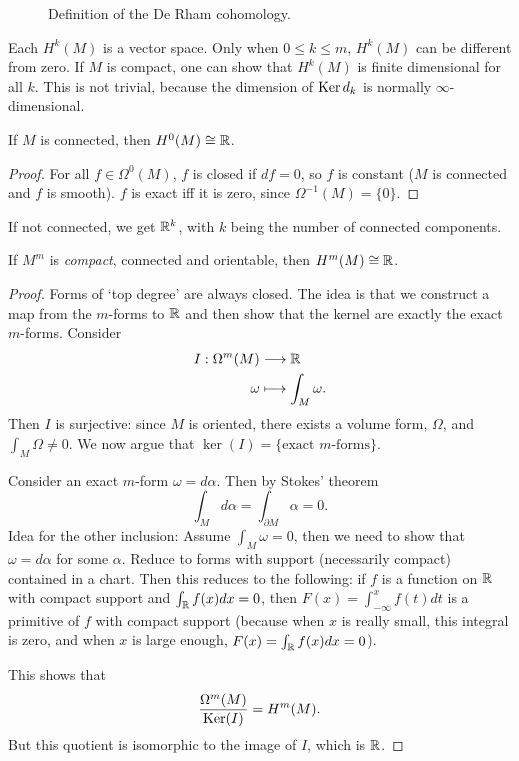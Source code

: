 \begin{figure}[H]
    \centering
    \caption{Definition of the De Rham cohomology. }
    \label{fig:rham-cohomology-definition}
\end{figure}
\begin{remark}
    Each $H^{k}(M)$ is a vector space.
    Only when $0 \le k \le m$, $H^{k}(M)$ can be different from zero.
    If $M$ is compact, one can show that $H^{k}(M)$ is finite dimensional for all $k$.
    This is not trivial, because the dimension of $\operatorname{Ker} d_k$ is normally $\infty$-dimensional.
 \end{remark}

\begin{prop}
    If $M$ is connected, then $H^{0}(M) \cong \mathbb{R}$.
\end{prop}
\begin{proof}
    For all $f \in \Omega^{0}(M)$, $f$ is closed if $df = 0$, so $f$ is constant ($M$ is connected and $f$ is smooth).
    $f$ is exact  iff it is zero, since $\Omega^{-1}(M) = \{0\}$.
\end{proof}
\begin{remark}
    If not connected, we get $\mathbb{R}^{k}$, with $k$ being the number of connected components.
\end{remark}
\begin{theorem}
    If $M^{m}$ is \emph{compact}, connected and orientable, then $H^{m}(M)\cong \mathbb{R}$.
\end{theorem}
\begin{proof}
    Forms of `top degree' are always closed.
    The idea is that we construct a map from the   $m$-forms to $\mathbb{R}$ and then show that the kernel are exactly the exact $m$-forms.
    Consider
    \begin{align*}
       I: \Omega^{m}(M)  &\longrightarrow \mathbb{R} \\
       \omega & \longmapsto \int_M \omega
    .\end{align*}
    Then $I$ is surjective: since $M$ is oriented, there exists a volume form, $\Omega$, and $\int_M \Omega \neq 0$. We now argue that $\ker(I)=\{\text{exact $m$-forms}\}$.
    
    
    
    Consider an exact $m$-form $\omega=d \alpha$. Then by Stokes' theorem
    \[
     \int_M d \alpha =  \int_{\partial M} \alpha = 0
    .\]
   Idea for the other inclusion: Assume $\int_M \omega = 0$, then we need to show that  $\omega = d\alpha$ for some $\alpha$.
    Reduce to forms with  support (necessarily compact) contained in a chart.
    Then this reduces to the following:
    if $f$ is a function on $\mathbb{R}$ with compact support and $\int_{\mathbb{R}} f(x) dx = 0$, then $F(x) = \int_{-\infty}^{x} f(t) dt $ is a primitive of $f$ with compact support  (because when $x$ is really small, this integral is zero, and when $x$ is large enough, $F(x) = \int_{\mathbb{R}} f(x) dx = 0$).

This shows that 
$$
    \frac{\Omega^{m}(M) }{\operatorname{Ker} (I)} = H^{m}(M).$$ But this quotient is 
isomorphic to the image of $I$, which is $\mathbb{R}$.\end{proof}
